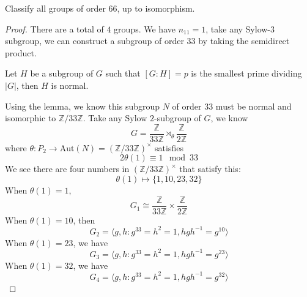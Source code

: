 \documentclass[openany]{book}
\newcommand{\Z}{\mathbb{Z}}
\newcommand{\la}{\langle}
\newcommand{\ra}{\rangle}
\begin{document}
\begin{prob}
    Classify all groups of order 66, up to isomorphism.
\end{prob}
\begin{proof}
    There are a total of $4$ groups. We have $n_{11}=1$, take any Sylow-$3$ subgroup, we can construct a subgroup of order $33$ by taking the semidirect product.
    \begin{lem}
        Let $H$ be a subgroup of $G$ such that $[G:H]=p$ is the smallest prime dividing $|G|$, then $H$ is normal.
    \end{lem}
    Using the lemma, we know this subgroup $N$ of order $33$ must be normal and isomorphic to $\Z/33\Z$. Take any Sylow $2$-subgroup of $G$, we know 
    \begin{equation*}
        G=\frac{\Z}{33\Z}\rtimes_\theta \frac{\Z}{2\Z}
    \end{equation*}
    where $\theta: P_2\to\text{Aut}(N)=(\Z/33\Z)^\times$ satisfies 
    \begin{equation*}
        2\theta(1)\equiv 1\mod 33
    \end{equation*}
    We see there are four numbers in $(\Z/33\Z)^\times$ that satisfy this:
    \begin{equation*}
        \theta(1)\mapsto \{1, 10, 23, 32\}
    \end{equation*}
    When $\theta(1)=1$, 
    \begin{equation*}
        G_1\cong\frac{\Z}{33\Z}\times\frac{\Z}{2\Z}
    \end{equation*}
    When $\theta(1)=10$, then 
    \begin{equation*}
        G_2=\la g,h: g^{33}=h^2=1, hgh^{-1}=g^{10}\ra
    \end{equation*}
    When $\theta(1)=23$, we have 
    \begin{equation*}
        G_3=\la g,h: g^{33}=h^2=1, hgh^{-1}=g^{23}\ra
    \end{equation*}
    When $\theta(1)=32$, we have 
    \begin{equation*}
        G_4=\la g,h: g^{33}=h^2=1, hgh^{-1}=g^{32}\ra
    \end{equation*}
\end{proof}
\end{document}
